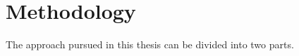 \chapter{Methodology}
\label{sec:methodology}

The approach pursued in this thesis can be divided into two parts.
